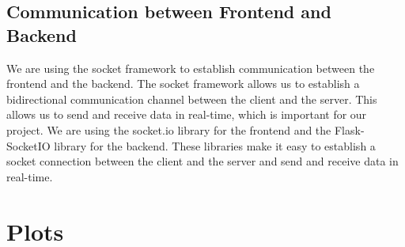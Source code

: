 \documentclass[12pt]{article}
\begin{document}
\subsection{Communication between Frontend and Backend}
We are using the socket framework to establish communication between the frontend and the backend. The socket framework allows us to establish a bidirectional communication channel between the client and the server. This allows us to send and receive data in real-time, which is important for our project. We are using the socket.io library for the frontend and the Flask-SocketIO library for the backend. These libraries make it easy to establish a socket connection between the client and the server and send and receive data in real-time.

\section{Plots}
\end{document}
